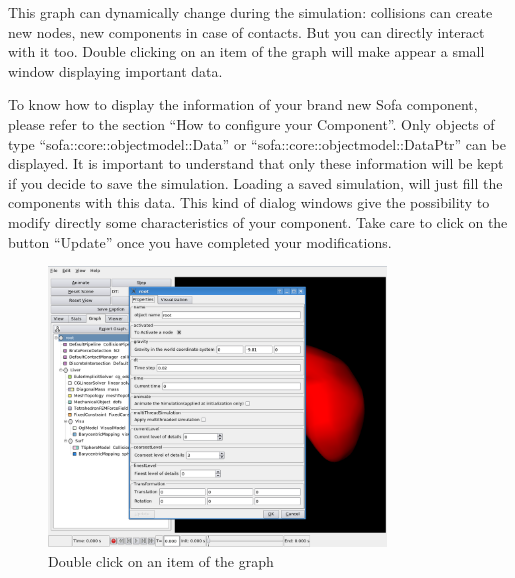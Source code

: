 This graph can dynamically change during the simulation: collisions can create new nodes, new components in case of contacts. But you can directly interact with it too. Double clicking on an item of the graph will make appear a small window displaying important data.

To know how to display the information of your brand new Sofa component, please refer to the section ``How to configure your Component''. Only objects of type ``sofa::core::objectmodel::Data'' or ``sofa::core::objectmodel::DataPtr'' can be displayed. It is important to understand that only these information will be kept if you decide to save the simulation. Loading a saved simulation, will just fill the components with this data.
This kind of dialog windows give the possibility to modify directly some characteristics of your component. Take care to click on the button ``Update'' once you have completed your modifications.

\begin{figure}[htpb]
	\centering
		\includegraphics[width=0.8\textwidth]{GUI/GUI_modify.png}
	\caption{Double click on an item of the graph}
\end{figure}

